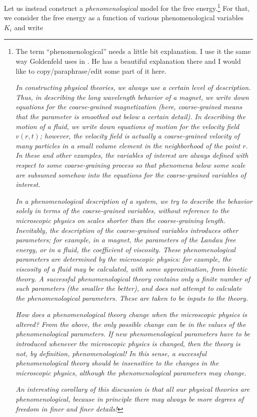 \documentclass[12pt]{article}
\numberwithin{equation}{section}
\begin{document}
Let us instead construct a \emph{phenomenological} model for the free energy.\footnote{The term ``phenomenological'' needs a little bit explanation. I use it the same way Goldenfeld uses in \cite{Goldenfeld:1992qy}. He has a beautiful explanation there and I would like to copy/paraphrase/edit some part of it here.

\emph{In constructing physical theories, we always use a certain level of description. Thus, in describing the long wavelength behavior of a magnet, we write down equations for the coarse-grained magnetization (here, coarse-grained means that the parameter is smoothed out below a certain detail). In describing the motion of a fluid, we write down equations of motion for the velocity field $v(r,t)$; however, the velocity field is actually a coarse-grained velocity of many particles in a small volume element in the neighborhood of the point $r$. In these and other examples, the variables of interest are always defined with respect to some coarse-graining process so that phenomena below some scale are subsumed somehow into the equations for the coarse-grained variables of interest. }

\emph{In a phenomenological description of a system, we try to describe the behavior solely in terms of the coarse-grained variables, without reference to the microscopic physics on scales shorter than the coarse-graining length. Inevitably, the description of the coarse-grained variables introduces other parameters; for example, in a magnet, the parameters of the Landau free energy, or in a fluid, the coefficient of viscosity. These phenomenological parameters are determined by the microscopic physics: for example, the viscosity of a fluid may be calculated, with some approximation, from kinetic theory. A successful phenomenological theory contains only a finite number of such parameters (the smaller the better), and does not attempt to calculate the phenomenological parameters. These are taken to be inputs to the theory.}

\emph{How does a phenomenological theory change when the microscopic physics is altered? From the above, the only possible change can be in the values of the phenomenological parameters. If new phenomenological parameters have to be introduced whenever the microscopic physics is changed, then the theory is not, by definition, phenomenological! In this sense, a successful phenomenological theory should be insensitive to the changes in the microscopic physics, although the phenomenological parameters may change.
}

\emph{An interesting corollary of this discussion is that all our physical theories are phenomenological, because in principle there may always be more degrees of freedom in finer and finer details!}} For that, we consider the free energy as a function of various phenomenological variables $K_i$ and write
\end{document}
